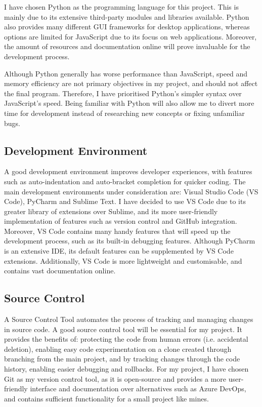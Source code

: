 \documentclass[../main/main.tex]{subfiles}
\begin{document}
I have chosen Python as the programming language for this project. This is mainly due to its extensive third-party modules and libraries available. Python also provides many different GUI frameworks for desktop applications, whereas options are limited for JavaScript due to its focus on web applications. Moreover, the amount of resources and documentation online will prove invaluable for the development process.

Although Python generally has worse performance than JavaScript, speed and memory efficiency are not primary objectives in my project, and should not affect the final program. Therefore, I have prioritised Python’s simpler syntax over JavaScript’s speed. Being familiar with Python will also allow me to divert more time for development instead of researching new concepts or fixing unfamiliar bugs.

\subsection{Development Environment}
A good development environment improves developer experiences, with features such as auto-indentation and auto-bracket completion for quicker coding. The main development environments under consideration are: Visual Studio Code (VS Code), PyCharm and Sublime Text. I have decided to use VS Code due to its greater library of extensions over Sublime, and its more user-friendly implementation of features such as version control and GitHub integration. Moreover, VS Code contains many handy features that will speed up the development process, such as its built-in debugging features. Although PyCharm is an extensive IDE, its default features can be supplemented by VS Code extensions. Additionally, VS Code is more lightweight and customisable, and contains vast documentation online.

\subsection{Source Control}
A Source Control Tool automates the process of tracking and managing changes in source code. A good source control tool will be essential for my project. It provides the benefits of: protecting the code from human errors (i.e. accidental deletion), enabling easy code experimentation on a clone created through branching from the main project, and by tracking changes through the code history, enabling easier debugging and rollbacks. For my project, I have chosen Git as my version control tool, as it is open-source and provides a more user-friendly interface and documentation over alternatives such as Azure DevOps, and contains sufficient functionality for a small project like mines.
\end{document}
